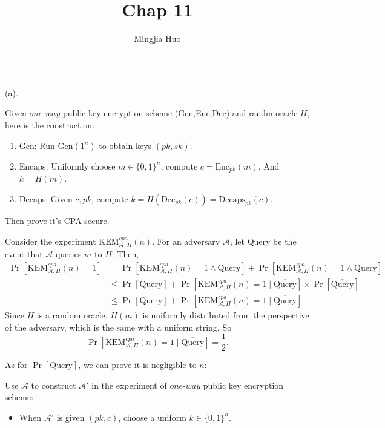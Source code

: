 \documentclass[a4paper]{article}
\newcommand{\Enc}{\text{Enc}}
\newcommand{\Dec}{\text{Dec}}
\newcommand{\Gen}{\text{Gen}}
\newcommand{\Query}{\text{Query}}
\newcommand{\Decaps}{\text{Decaps}}
\newcommand{\KEM}{\text{KEM}}
\newcommand{\A}{\mathcal{A}}
\newenvironment{problem}[2][Problem]{\begin{trivlist}
\item[\hskip \labelsep {\bfseries #1}\hskip \labelsep {\bfseries #2.}]}{\end{trivlist}}
\begin{document}
 
 
\title{Chap 11}
\author{Mingjia Huo}
\date{}
\maketitle

\begin{problem}{11.3}$ $\par
(a).\par
Given $one$-$way$ public key encryption scheme (Gen,Enc,Dec) and randm oracle $H$, here is the construction:
\begin{enumerate}
    \item Gen: Run $\Gen(1^n)$ to obtain keys $(pk,sk)$.
    \item Encaps: Uniformly choose $m\in\{0,1\}^n$, compute $c=\Enc_{pk}(m)$. And $k=H(m)$.
    \item Decaps: Given $c,pk$, compute $k=H(\Dec_{pk}(c))=\Decaps_{pk}(c)$. 
\end{enumerate}\par
Then prove it's CPA-secure.\par
Consider the experiment $\KEM_{\A,\Pi}^{cpa}(n)$. For an adversary $\A$, let $\Query$ be the event that $\A$ queries $m$ to $H$. Then,
\begin{align*}
    \Pr[\KEM_{\A,\Pi}^{cpa}(n)=1]&=\Pr[\KEM_{\A,\Pi}^{cpa}(n)=1\land\Query]+\Pr[\KEM_{\A,\Pi}^{cpa}(n)=1\land\overline{\Query}]\\
    &\le \Pr[\Query]+\Pr[\KEM_{\A,\Pi}^{cpa}(n)=1\mid\overline{\Query}]\times\Pr[\overline{\Query}]\\
    &\le \Pr[\Query]+\Pr[\KEM_{\A,\Pi}^{cpa}(n)=1\mid\overline{\Query}]
\end{align*}
Since $H$ is a random oracle, $H(m)$ is uniformly distributed from the perspective of the adversary, which is the same with a uniform string. So
$$\Pr[\KEM_{\A,\Pi}^{cpa}(n)=1\mid\overline{\Query}]=\frac12.$$\par
As for $\Pr[\Query]$, we can prove it is negligible to $n$:\par
Use $\A$ to construct $\A'$ in the experiment of $one$-$way$ public key encryption scheme:
\begin{itemize}
    \item When $\A'$ is given $(pk,c)$, choose a uniform $k\in\{0,1\}^n$.

\end{itemize}
\end{problem}
\end{document}

